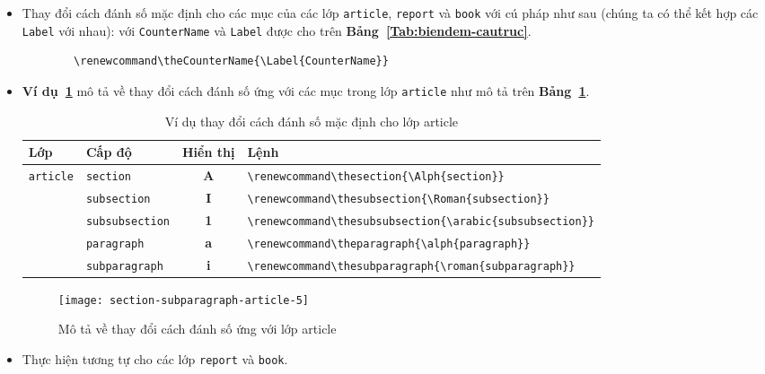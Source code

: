 \documentclass[12pt,a4paper]{article}
\newcommand{\tab}[1]{\textbf{Bảng~#1}}
\newcommand{\ex}[1]{\textbf{Ví dụ~#1}}
\newcommand{\head}[1]{\textbf{#1}}
\newcommand{\command}[1]{\texttt{\string#1}}
\begin{document}
\begin{itemize}
  \item Thay đổi cách đánh số mặc định cho các mục của các lớp \Verb|article|, \Verb|report| và \Verb|book| với cú pháp như sau (chúng ta có thể kết hợp các \Verb|Label| với nhau): với \Verb|CounterName| và \Verb|Label| được cho trên \tab{\ref{Tab:biendem-cautruc}}.
        \begin{verbatim}
        \renewcommand\theCounterName{\Label{CounterName}}
      \end{verbatim}

  \item \ex{\ref{Ex:thaydoi-label-article}} mô tả về thay đổi cách đánh số ứng với các mục trong lớp \Verb|article| như mô tả trên \tab{\ref{Tab:label-cautruc}}.

        \begin{table}[h]
          \begin{center}
            \begin{footnotesize}
              \begin{tabular}{llcl}\toprule
                \head{Lớp}                         & \head{Cấp độ}        & \head{Hiển thị} & \head{Lệnh}                                                   \\ \midrule
                \multirow{7}{*}{\command{article}} & \Verb|section|       & \textbf{A}      & \Verb|\renewcommand\thesection{\Alph{section}}|               \\ \cmidrule{2-4}
                                                   & \Verb|subsection|    & \textbf{I}      & \Verb|\renewcommand\thesubsection{\Roman{subsection}}|        \\ \cmidrule{2-4}
                                                   & \Verb|subsubsection| & \textbf{1}      & \Verb|\renewcommand\thesubsubsection{\arabic{subsubsection}}| \\ \cmidrule{2-4}
                                                   & \Verb|paragraph|     & \textbf{a}      & \Verb|\renewcommand\theparagraph{\alph{paragraph}}|           \\ \cmidrule{2-4}
                                                   & \Verb|subparagraph|  & \textbf{i}      & \Verb|\renewcommand\thesubparagraph{\roman{subparagraph}}|    \\ \bottomrule
              \end{tabular}
            \end{footnotesize}
          \end{center}
          \caption{Ví dụ thay đổi cách đánh số mặc định cho lớp article} \label{Tab:label-cautruc}
        \end{table}

        \begin{figure}
          \begin{center}
            \texttt{[image: section-subparagraph-article-5]}
          \end{center}
          \caption{Mô tả về thay đổi cách đánh số ứng với lớp article} \label{Ex:thaydoi-label-article}
        \end{figure}
        \newpage
  \item Thực hiện tương tự cho các lớp \Verb|report| và \Verb|book|.
\end{itemize}
\end{document}

